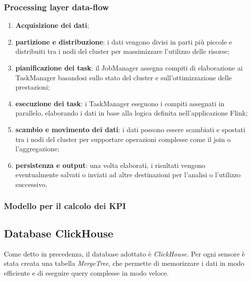 \subsubsection{Processing layer data-flow}
\begin{enumerate}
    \item \textbf{Acquisizione dei dati};
    \item \textbf{partizione e distribuzione}: i dati vengono divisi in parti più piccole e distribuiti tra i nodi del cluster per massimizzare l'utilizzo delle risorse;
    \item \textbf{pianificazione dei task}: il JobManager assegna compiti di elaborazione ai TaskManager basandosi sullo stato del cluster e sull'ottimizzazione delle prestazioni;
    \item \textbf{esecuzione dei task}: i TaskManager eseguono i compiti assegnati in parallelo, elaborando i dati in base alla logica definita nell'applicazione Flink;
    \item \textbf{scambio e movimento dei dati}: i dati possono essere scambiati e spostati tra i nodi del cluster per supportare operazioni complesse come il join o l'aggregazione;
    \item \textbf{persistenza e output}: una volta elaborati, i risultati vengono eventualmente salvati o inviati ad altre destinazioni per l'analisi o l'utilizzo successivo.
\end{enumerate}
\subsubsection{Modello per il calcolo dei KPI}



\subsection{Database ClickHouse}
Come detto in precedenza, il database adottato è \textit{ClickHouse}. Per ogni sensore è stata creata una tabella \textit{MergeTree}, che permette di memorizzare i dati in modo efficiente e di eseguire query complesse in modo veloce.

